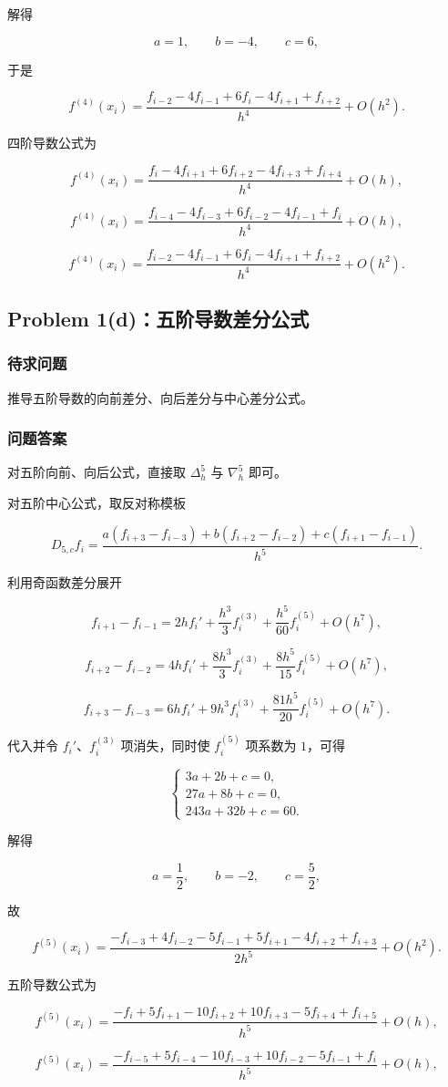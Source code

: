 \documentclass[12pt,a4paper,fontset=none]{ctexart}
\newcommand{\problem}[1]{\subsection{#1}}
\newcommand{\blocktitle}[1]{\subsubsection{#1}}
\begin{document}
解得

\[
a=1,\qquad b=-4,\qquad c=6,
\]

于是

\[
f^{(4)}(x_i)=\frac{f_{i-2}-4f_{i-1}+6f_i-4f_{i+1}+f_{i+2}}{h^4}+O(h^2).
\]

四阶导数公式为

\[
f^{(4)}(x_i)=\frac{f_i-4f_{i+1}+6f_{i+2}-4f_{i+3}+f_{i+4}}{h^4}+O(h),
\]

\[
f^{(4)}(x_i)=\frac{f_{i-4}-4f_{i-3}+6f_{i-2}-4f_{i-1}+f_i}{h^4}+O(h),
\]

\[
f^{(4)}(x_i)=\frac{f_{i-2}-4f_{i-1}+6f_i-4f_{i+1}+f_{i+2}}{h^4}+O(h^2).
\]


\problem{Problem 1(d)：五阶导数差分公式}

\blocktitle{待求问题}
推导五阶导数的向前差分、向后差分与中心差分公式。

\blocktitle{问题答案}
对五阶向前、向后公式，直接取 \(\Delta_h^5\) 与 \(\nabla_h^5\) 即可。

对五阶中心公式，取反对称模板

\[
D_{5,c}f_i
=\frac{a(f_{i+3}-f_{i-3})+b(f_{i+2}-f_{i-2})+c(f_{i+1}-f_{i-1})}{h^5}.
\]

利用奇函数差分展开

\[
f_{i+1}-f_{i-1}
=2h f_i'+\frac{h^3}{3}f_i^{(3)}+\frac{h^5}{60}f_i^{(5)}+O(h^7),
\]

\[
f_{i+2}-f_{i-2}
=4h f_i'+\frac{8h^3}{3}f_i^{(3)}+\frac{8h^5}{15}f_i^{(5)}+O(h^7),
\]

\[
f_{i+3}-f_{i-3}
=6h f_i'+9h^3 f_i^{(3)}+\frac{81h^5}{20}f_i^{(5)}+O(h^7).
\]

代入并令 \(f_i'\)、\(f_i^{(3)}\) 项消失，同时使 \(f_i^{(5)}\) 项系数为 \(1\)，可得

\[
\begin{cases}
3a+2b+c=0,\\
27a+8b+c=0,\\
243a+32b+c=60.
\end{cases}
\]

解得

\[
a=\frac{1}{2},\qquad b=-2,\qquad c=\frac{5}{2},
\]

故

\[
f^{(5)}(x_i)=\frac{-f_{i-3}+4f_{i-2}-5f_{i-1}+5f_{i+1}-4f_{i+2}+f_{i+3}}{2h^5}+O(h^2).
\]

五阶导数公式为

\[
f^{(5)}(x_i)=\frac{-f_i+5f_{i+1}-10f_{i+2}+10f_{i+3}-5f_{i+4}+f_{i+5}}{h^5}+O(h),
\]

\[
f^{(5)}(x_i)=\frac{-f_{i-5}+5f_{i-4}-10f_{i-3}+10f_{i-2}-5f_{i-1}+f_i}{h^5}+O(h),
\]
\end{document}

